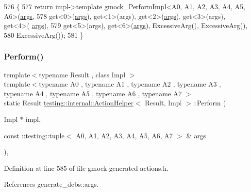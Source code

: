 \begin{DoxyCode}
576                      \{
577     \textcolor{keywordflow}{return} impl->template gmock\_PerformImpl<A0, A1, A2, A3, A4, A5, A6>(\hyperlink{namespacegenerate__debs_a75f9143e38df82d83b2e8a6f99cae02c}{args},
578         get<0>(\hyperlink{namespacegenerate__debs_a75f9143e38df82d83b2e8a6f99cae02c}{args}), get<1>(args), get<2>(\hyperlink{namespacegenerate__debs_a75f9143e38df82d83b2e8a6f99cae02c}{args}), get<3>(args), get<4>(
      \hyperlink{namespacegenerate__debs_a75f9143e38df82d83b2e8a6f99cae02c}{args}),
579         get<5>(args), get<6>(\hyperlink{namespacegenerate__debs_a75f9143e38df82d83b2e8a6f99cae02c}{args}), ExcessiveArg(), ExcessiveArg(),
580         ExcessiveArg());
581   \}
\end{DoxyCode}
\mbox{\label{classtesting_1_1internal_1_1ActionHelper_a1f851f76793206daf2dd8a2f9621f43c}} 
\subsubsection{\texorpdfstring{Perform()}{Perform()}\hspace{0.1cm}{\footnotesize\ttfamily [9/11]}}
{\footnotesize\ttfamily template$<$typename Result , class Impl $>$ \\
template$<$typename A0 , typename A1 , typename A2 , typename A3 , typename A4 , typename A5 , typename A6 , typename A7 $>$ \\
static Result \hyperlink{classtesting_1_1internal_1_1ActionHelper}{testing\+::internal\+::\+Action\+Helper}$<$ Result, Impl $>$\+::Perform (\begin{DoxyParamCaption}\item[{Impl $\ast$}]{impl,  }\item[{const \+::testing\+::tuple$<$ A0, A1, A2, A3, A4, A5, A6, A7 $>$ \&}]{args }\end{DoxyParamCaption})\hspace{0.3cm}{\ttfamily [inline]}, {\ttfamily [static]}}



Definition at line 585 of file gmock-\/generated-\/actions.\+h.



References generate\+\_\+debs\+::args.



